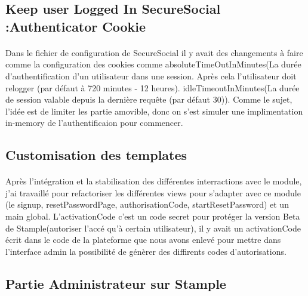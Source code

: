 \subsection{Keep user Logged In SecureSocial :Authenticator Cookie}
\paragraph{}
Dans le fichier de configuration de SecureSocial il y avait des changements à faire comme la configuration des cookies comme absoluteTimeOutInMinutes(La durée d'authentification d'un utilisateur dans une session. Après cela l'utilisateur doit relogger (par défaut à 720 minutes - 12 heures).
idleTimeoutInMinutes(La durée de session valable depuis la dernière requête (par défaut 30)).
Comme le sujet, l'idée est de limiter les partie amovible, donc on s'est simuler une implimentation in-memory de l'authentificaion pour commencer.
\subsection{Customisation des templates}
\paragraph{}
Après l'intégration et la stabilisation des différentes interractions avec le module, j'ai travaillé pour refactoriser les différentes views pour s'adapter avec ce module (le signup, resetPasswordPage, authorisationCode, startResetPassword) et un main global.
L'activationCode c'est un code secret pour protéger la version Beta de Stample(autoriser l'accé qu'à certain utilisateur), il y avait un activationCode écrit dans le code de la plateforme que nous avons enlevé pour mettre dans l'interface admin la possibilité de génèrer des diffirents codes d'autorisations.

\subsection{Partie Administrateur sur Stample}
